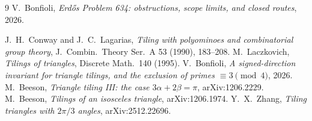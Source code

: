 \documentclass[11pt,reqno]{amsart}
\theoremstyle{plain}
\theoremstyle{definition}
\begin{document}
\begin{thebibliography}{9}
 V.~Bonfioli, \emph{Erd\H{o}s Problem 634: obstructions, scope limits, and closed routes}, 2026.

 J.~H.~Conway and J.~C.~Lagarias, \emph{Tiling with polyominoes and
combinatorial group theory}, J.\ Combin.\ Theory Ser.\ A 53 (1990), 183--208.
 M.~Laczkovich, \emph{Tilings of triangles}, Discrete Math.\ 140 (1995).
 V.~Bonfioli, \emph{A signed-direction invariant for triangle tilings, and the
exclusion of primes $\equiv3\pmod4$}, 2026.
 M.~Beeson, \emph{Triangle tiling III: the case $3\alpha+2\beta=\pi$},
arXiv:1206.2229.
 M.~Beeson, \emph{Tilings of an isosceles triangle}, arXiv:1206.1974.
 Y.~X.~Zhang, \emph{Tiling triangles with $2\pi/3$ angles}, arXiv:2512.22696.
\end{thebibliography}
\end{document}
